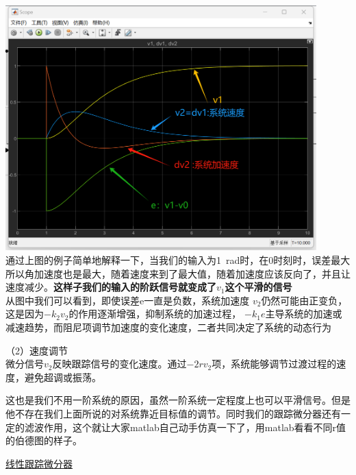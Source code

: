 \documentclass[UTF8,a4paper,12pt]{ctexart}
\begin{document}
              \par \includegraphics[width=12cm]{picture/tracking_differentiator_scope.png}\\
              通过上图的例子简单地解释一下，当我们的输入为1\ rad时，在0时刻时，误差最大所以角加速度也是最大，随着速度来到了最大值，随着加速度应该反向了，并且让速度减少。\textbf{这样子我们的输入的阶跃信号就变成了$v_1$这个平滑的信号}\\
              从图中我们可以看到，即使误差e一直是负数，系统加速度 $v_2$仍然可能由正变负，这是因为$-k_2v_2$的作用逐渐增强，抑制系统的加速过程， $-k_1e$主导系统的加速或减速趋势，而阻尼项调节加速度的变化速度，二者共同决定了系统的动态行为\\
              \begin{flushleft}
                （2）速度调节\\
              微分信号$v_2$反映跟踪信号的变化速度。通过$-2rv_2$项，系统能够调节过渡过程的速度，避免超调或振荡。\\
              \begin{flushleft}
                这也是我们不用一阶系统的原因，虽然一阶系统一定程度上也可以平滑信号。但是他不存在我们上面所说的对系统靠近目标值的调节。同时我们的跟踪微分器还有一定的滤波作用，这个就让大家matlab自己动手仿真一下了，用matlab看看不同r值的伯德图的样子。

              \end{flushleft}
              \end{flushleft}
              

          \href{https://blog.csdn.net/weiequest_misc=&request_id=&biz_id=102&utm_term=%E8%B7%9F%E8%B8%AA%E5%BE%AE%E5%88%86%E5%99%A8&utm_medium=distribute.pc_search_result.none-task-blog-2~all~sobaiduweb~default-3-124520209.142^v101^pc_search_result_base1&spm=1018.2226.3001.4187}{线性跟踪微分器}
\end{document}
